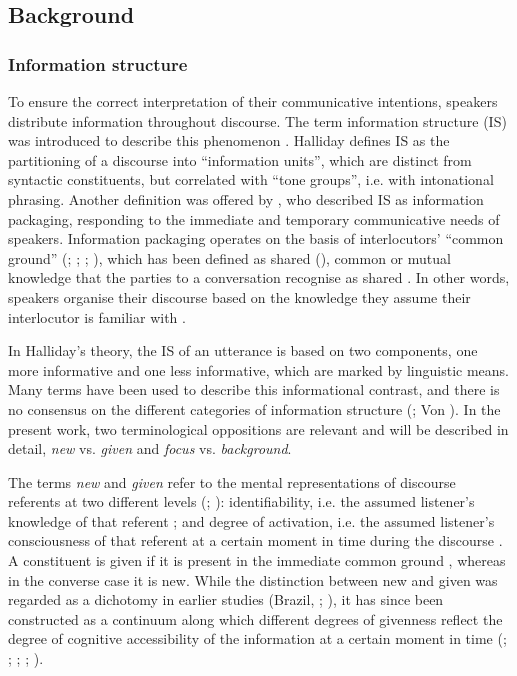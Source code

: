 \subsection{Background} 
\hypertarget{Toc191305883}{}\subsubsection{Information structure}
\hypertarget{Toc191305884}{}
To ensure the correct interpretation of their communicative intentions, speakers distribute information throughout discourse. The term information structure (IS) was introduced to describe this phenomenon \citep{Halliday1967}. Halliday defines IS as the partitioning of a discourse into “information units”, which are distinct from syntactic constituents, but correlated with “tone groups”, i.e. with intonational phrasing. Another definition was offered by \citet{Chafe1976}, who described IS as information packaging, responding to the immediate and temporary communicative needs of speakers. Information packaging operates on the basis of interlocutors’ “common ground” (\citealt{Chafe1976}; \citealt{Karttunen1974}; \citealt{Krifka2008}; \citealt{Stalnaker1974}), which has been defined as shared (\citealt{ClarkHaviland1977}), common \citep{Lewis1979} or mutual \citep{Schiffer1972} knowledge that the parties to a conversation recognise as shared \citep{Stalnaker2002}. In other words, speakers organise their discourse based on the knowledge they assume their interlocutor is familiar with \citep{Prince1981}.

In Halliday’s theory, the IS of an utterance is based on two components, one more informative and one less informative, which are marked by linguistic means. Many terms have been used to describe this informational contrast, and there is no consensus on the different categories of information structure (\citealt{Büring2007}; Von \citealt{Heusinger1999}). In the present work, two terminological oppositions are relevant and will be described in detail, \textit{new} vs. \textit{given} and \textit{focus} vs. \textit{background}.

The terms \textit{new} and \textit{given} refer to the mental representations of discourse referents at two different levels (\citealt{Chafe1994}; \citealt{Lambrecht1994}): identifiability, i.e. the assumed listener’s knowledge of that referent \citep{Prince1981}; and degree of activation, i.e. the assumed listener’s consciousness of that referent at a certain moment in time during the discourse \citep{Chafe1994}. A constituent is given if it is present in the immediate common ground \citep{Krifka2008}, whereas in the converse case it is new. While the distinction between new and given was regarded as a dichotomy in earlier studies (Brazil, \citealt{CoulthardJohns1980}; \citealt{Halliday1967}), it has since been constructed as a continuum along which different degrees of givenness reflect the degree of cognitive accessibility of the information at a certain moment in time (\citealt{Baumann2005}; \citealt{BaumannGrice2006}; \citealt{BaumannRiester2012}; \citealt{Chafe1994}; \citealt{Prince1981}).

